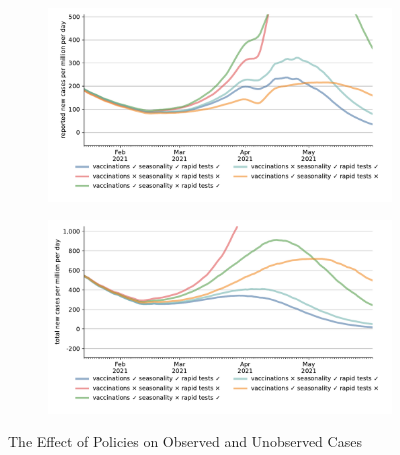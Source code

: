 \begin{figure}[ht]
  \centering
  \begin{subfigure}{.6\textwidth}
    \includegraphics[width=0.9 \textwidth]{figures/results/figures/scenario_comparisons/one_off_and_combined/full_new_known_case_cropped}
  \end{subfigure}%
  \begin{subfigure}{.6\textwidth}
    \includegraphics[width=0.9 \textwidth]{figures/results/figures/scenario_comparisons/one_off_and_combined/full_newly_infected_cropped}
  \end{subfigure}
  \caption{The Effect of Policies on Observed and Unobserved Cases}
  \label{fig:explain_decline}
\end{figure}



